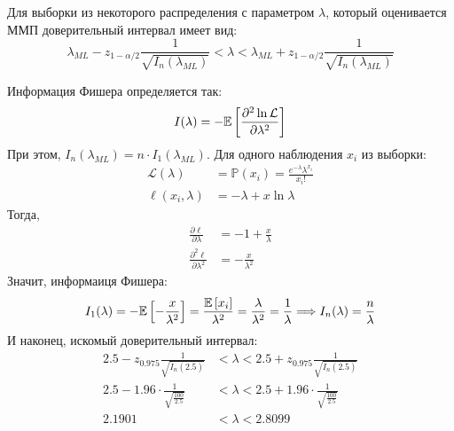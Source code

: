 \documentclass{article}
\begin{document}
Для выборки из некоторого распределения с параметром $\lambda$, который оценивается ММП доверительный интервал имеет вид:
\begin{equation*}
    \lambda_{M L}-z_{1-\alpha / 2} \frac{1}{\sqrt{I_n\left(\lambda_{M L}\right)}} < \lambda < \lambda_{M L}+z_{1-\alpha / 2} \frac{1}{\sqrt{I_n\left(\lambda_{M L}\right)}}
\end{equation*}

Информация Фишера определяется так:
\begin{equation*}
    I(\lambda)=-\mathbb{E}\left[\frac{\partial^2\ln\mathcal{L}}{\partial\lambda^2}\right]
\end{equation*}
При этом, $I_n\left(\lambda_{M L}\right)=n\cdot I_1(\lambda_{ML})$. Для одного наблюдения $x_i$ из выборки:
\begin{equation*}
    \begin{aligned}
        \mathcal{L}(\lambda)&=\mathbb{P}(x_i)=\frac{e^{-\lambda}\lambda^{x_i}}{x_i!}\\
        \ell(x_i,\lambda)&=-\lambda + x \ln \lambda
    \end{aligned}
\end{equation*}
Тогда,
\begin{equation*}
    \begin{aligned}
        \frac{\partial\ell}{\partial\lambda}&=-1 + \frac{x}{\lambda}\\
        \frac{\partial^2\ell}{\partial\lambda^2}&=-\frac{x}{\lambda^2}
    \end{aligned}
\end{equation*}
Значит, информаиця Фишера:
\begin{equation*}
    I_1(\lambda)=-\mathbb{E}\left[-\frac{x}{\lambda^2}\right]=\frac{\mathbb{E}\left[x_i\right]}{\lambda^2}=\frac{\lambda}{\lambda^2}=\frac{1}{\lambda}\Longrightarrow I_n(\lambda)=\frac{n}{\lambda}
\end{equation*}
И наконец, искомый доверительный интервал:
\begin{equation*}
    \begin{aligned}
        2.5-z_{0.975} \frac{1}{\sqrt{I_n\left(2.5\right)}}&< \lambda < 2.5+z_{0.975} \frac{1}{\sqrt{I_n\left(2.5\right)}}\\
        2.5-1.96\cdot\frac{1}{\sqrt{\frac{100}{2.5}}}&< \lambda < 2.5+1.96\cdot\frac{1}{\sqrt{\frac{100}{2.5}}}\\
        2.1901&< \lambda < 2.8099
    \end{aligned}
\end{equation*}
\end{document}
